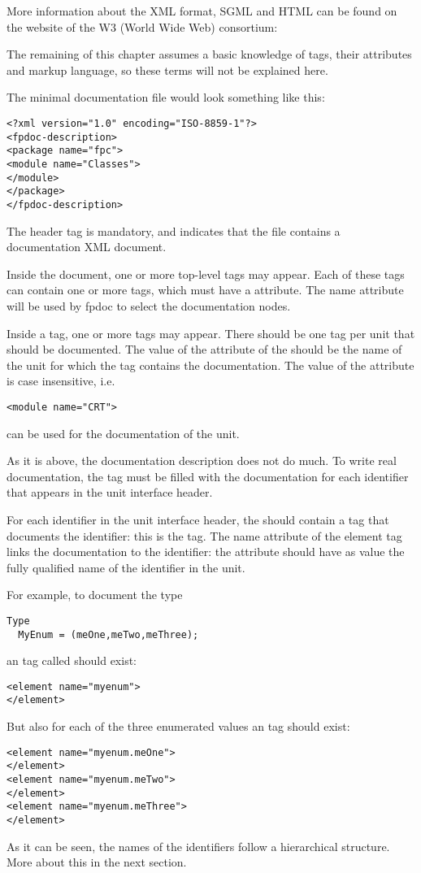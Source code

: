 More information about the XML format, SGML and HTML can be found on the 
website of the W3 (World Wide Web) consortium:  

The remaining of this chapter assumes a basic knowledge of tags, their
attributes and markup language, so these terms will not be explained here. 

The minimal documentation file would look something like this:
\begin{verbatim}
<?xml version="1.0" encoding="ISO-8859-1"?>
<fpdoc-description>
<package name="fpc">
<module name="Classes">
</module>
</package>
</fpdoc-description>
\end{verbatim}
The header  tag is mandatory, and indicates that the file contains a
documentation XML document.

Inside the document, one or more top-level  
tags may appear. Each of these tags can contain one or more 
tags, which must have a  attribute. The name attribute will be
used by fpdoc to select the documentation nodes.

Inside a  tag, one or more  tags may appear. There
should be one  tag per unit that should be documented. The value
of the  attribute of the  should be the name of the
unit for which the  tag contains the documentation. The value
of the  attribute is case insensitive, i.e. 
\begin{verbatim}
<module name="CRT">
\end{verbatim}
can be used for the documentation of the  unit.

As it is above, the documentation description does not do much. To write
real documentation, the  tag must be filled with the
documentation for each identifier that appears in the unit interface header.

For each identifier in the unit interface header, the  should
contain a tag that documents the identifier: this is the  tag.
The name attribute of the element tag links the documentation to the
identifier: the  attribute should have as value the fully
qualified name of the identifier in the unit.

For example, to document the type
\begin{verbatim}
Type
  MyEnum = (meOne,meTwo,meThree);
\end{verbatim}
an  tag called  should exist:
\begin{verbatim}
<element name="myenum">
</element>
\end{verbatim}
But also for each of the three enumerated values an  tag should 
exist:
\begin{verbatim}
<element name="myenum.meOne">
</element>
<element name="myenum.meTwo">
</element>
<element name="myenum.meThree">
</element>
\end{verbatim}
As it can be seen, the names of the identifiers follow a hierarchical
structure. More about this in the next section.

